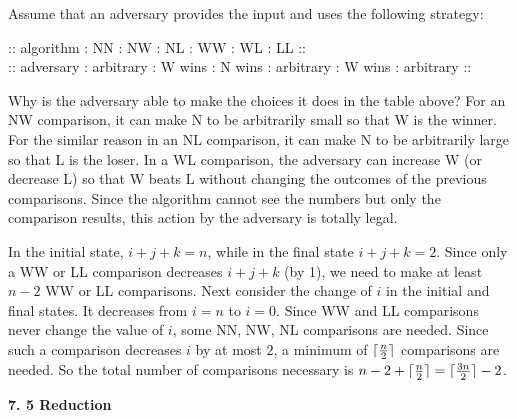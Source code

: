 \begin{itemize}
    Assume that an adversary provides the input and uses the following
    strategy:
    
    
    :: algorithm : NN : NW : NL : WW : WL : LL :: \\
    :: adversary : arbitrary : W wins : N wins : arbitrary : W wins : arbitrary ::
   
    
    Why is the adversary able to make the choices it does in the table
    above? For an NW comparison, it can make N to be arbitrarily small 
    so that W is the winner. For the similar reason in an NL comparison,
    it can make N to be arbitrarily large so that L is the loser.
    In a WL comparison, the adversary can increase W (or decrease L) so
    that W beats L without changing the outcomes of the previous
    comparisons. Since the algorithm cannot see the numbers but only
    the comparison results, this action by the adversary is totally
    legal. 
    
    In the initial state, $i+j+k=n$, while in the final state 
    $i+j+k=2$. Since only a WW or LL comparison decreases $i+j+k$
    (by 1), we need to make at least $n-2$ WW or LL comparisons.
    Next consider the change of $i$ in the initial and final states.
    It decreases from $i=n$ to $i=0$. Since WW and LL comparisons
    never change the value of $i$, some NN, NW, NL comparisons are
    needed. Since such a comparison decreases $i$ by at most $2$,
    a minimum of $\lceil{n\over2}\rceil$ comparisons are needed.
    So the total number of comparisons necessary is
    $n-2+\lceil{n\over2}\rceil=\lceil{3n\over2}\rceil-2$.
     
\end{itemize}
\textbf{7. 5 Reduction}

